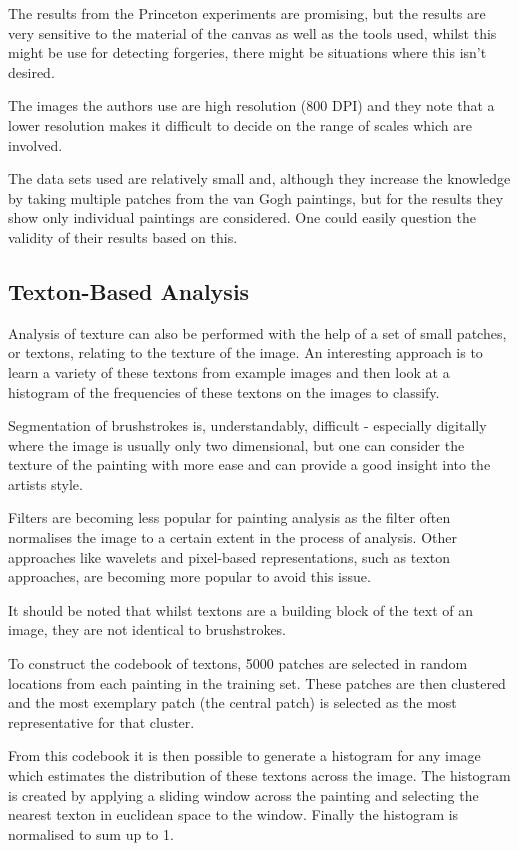 \documentclass[conference]{IEEEtran}
\begin{document}
The results from the Princeton experiments are promising, but the results are
very sensitive to the material of the canvas as well as the tools used, whilst
this might be use for detecting forgeries, there might be situations where this
isn't desired.

The images the authors use are high resolution (800 DPI) and they note that a
lower resolution makes it difficult to decide on the range of scales which are
involved.

The data sets used are relatively small and, although they increase the
knowledge by taking multiple patches from the van Gogh paintings, but for the
results they show only individual paintings are considered. One could easily
question the validity of their results based on this.


\subsection{Texton-Based Analysis}

Analysis of texture can also be performed with the help of a set of small
patches, or textons, relating to the texture of the image. An interesting
approach is to learn a variety of these textons from example images and then
look at a histogram of the frequencies of these textons on the images to
classify\cite{van2010texton}.

Segmentation of brushstrokes is, understandably, difficult - especially
digitally where the image is usually only two dimensional, but one can consider
the texture of the painting with more ease and can provide a good insight into
the artists style.

Filters are becoming less popular for painting analysis as the filter often
normalises the image to a certain extent in the process of analysis. Other
approaches like wavelets and pixel-based representations, such as texton
approaches, are becoming more popular to avoid this issue.

It should be noted that whilst textons are a building block of the text of an
image, they are not identical to brushstrokes.

To construct the codebook of textons, 5000 patches are selected in random
locations from each painting in the training set. These patches are then
clustered and the most exemplary patch (the central patch) is selected as the
most representative for that cluster.

From this codebook it is then possible to generate a histogram for any image
which estimates the distribution of these textons across the image. The
histogram is created by applying a sliding window across the painting and
selecting the nearest texton in euclidean space to the window. Finally the
histogram is normalised to sum up to 1.
\end{document}
